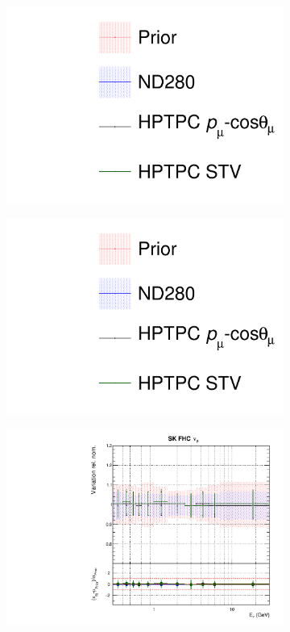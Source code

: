 \begin{figure}[t]
\centering
\begin{subfigure}{0.3\textwidth}
  \centering
  \includegraphics[width=1.0\linewidth, trim={5mm  90mm 0mm 0mm}, clip]{figs/hptpcfits_leg}	
\end{subfigure}
\begin{subfigure}{0.3\textwidth}
  \centering
  \includegraphics[width=1.0\linewidth, trim={5mm  0mm 0mm 95mm}, clip]{figs/hptpcfits_leg}	
\end{subfigure}
\begin{subfigure}{0.45\textwidth}
  \centering
  \includegraphics[width=0.75\linewidth]{figs/hptpcfitsflux_8}

\end{subfigure}
\end{figure}
